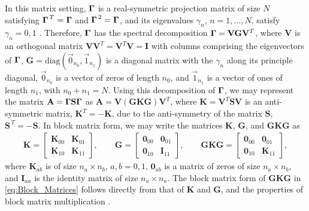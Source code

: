 \documentclass[11pt]{amsart}
\newcommand{\Kb}{\mathbf{K}}
\newcommand{\Ib}{\mathbf{I}}
\newcommand{\Sb}{\mathbf{S}}
\newcommand{\Ab}{\mathbf{A}}
\newcommand{\Ob}{\mathbf{0}}
\newcommand{\Vb}{\mathbf{V}}
\newcommand{\Gb}{\mathbf{G}}
\newcommand\bGamma{\mbox{\boldmath${\Gamma}$}}
\begin{document}
In this matrix setting, $\bGamma$ is a real-symmetric projection
matrix of size $N$ satisfying $\bGamma^{\,T}=\bGamma$ and
$\bGamma^{\,2}=\bGamma$, and its eigenvalues $\gamma_n$, $n=1,\ldots,N$, satisfy
$\gamma_n=0,1$ \cite{Halmos-1958,Horn_Johnson-1990}. Therefore,
$\bGamma$ has the spectral decomposition $\bGamma=\Vb\Gb\Vb^T$, where
$\Vb$ is an orthogonal matrix $\Vb\Vb^T=\Vb^T\Vb=\Ib$ with columns
comprising the eigenvectors of $\bGamma$,
$\Gb=\text{diag}(\vec{0}_{n_0},\vec{1}_{n_1})$ is a diagonal matrix
with the $\gamma_n$ along its principle diagonal, $\vec{0}_{n_0}$ is a
vector of zeros of length $n_0$, and $\vec{1}_{n_1}$ is a vector of
ones of length $n_1$, with $n_0+n_1=N$. Using this 
decomposition of $\bGamma$, we may represent the matrix
$\Ab=\bGamma\Sb\bGamma$ as $\Ab=\Vb(\Gb\Kb\Gb)\Vb^T$, where
$\Kb=\Vb^T\Sb\Vb$ is an anti-symmetric matrix, $\Kb^T=-\Kb$, due to the
anti-symmetry of the matrix $\Sb$, $\Sb^{\,T}=-\Sb$. In block matrix
form, we may write the matrices  $\Kb$, $\Gb$, and $\Gb\Kb\Gb$ as
%
\begin{align}\label{eq:Block_Matrices}
%
\Kb=\left[
  \begin{array}{ccc}
    \Kb_{00}&\Kb_{01}\\
    \Kb_{10}&\Kb_{11}   
    \end{array}
\right],
\qquad
\Gb=\left[
  \begin{array}{ccc}
    \Ob_{00}&\Ob_{01}\\
    \Ob_{10}&\Ib_{11}   
    \end{array}
\right],
\qquad
\Gb\Kb\Gb=\left[
  \begin{array}{ccc}
    \Ob_{00}&\Ob_{01}\\
    \Ob_{10}&\Kb_{11}   
    \end{array}
\right],
%
\end{align}
%
where $\Kb_{ab}$ is of size $n_a\times n_b$, $a,b=0,1$, $\Ob_{ab}$
is a matrix of zeros of size $n_a\times n_b$, and $\Ib_{aa}$ is
the identity matrix of size $n_a\times n_a$. The block matrix form of
$\Gb\Kb\Gb$ in \eqref{eq:Block_Matrices} follows directly from that of
$\Kb$ and $\Gb$, and the properties of block matrix multiplication
\cite{Demmel:1997}.  
\end{document}
